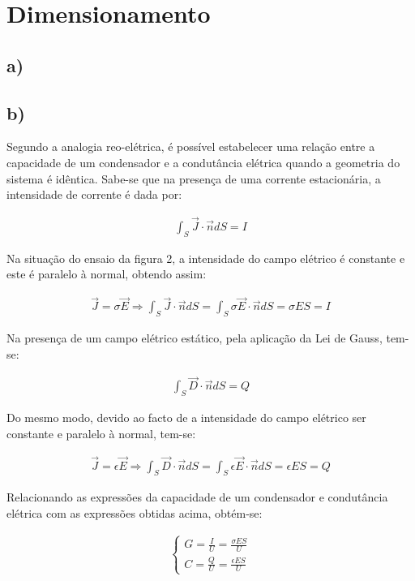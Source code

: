 \documentclass[portuguese, a4paper, titlepage]{article}
\begin{document}
	\section{Dimensionamento}
	\subsection{a)}

	\subsection{b)}
	Segundo a analogia reo-elétrica, é possível estabelecer uma relação entre a capacidade de um condensador e a condutância elétrica quando a geometria do sistema é idêntica.
	Sabe-se que na presença de uma corrente estacionária, a intensidade de corrente é dada por:

	\begin{align*}
		\int _ { S } \vec{J} \cdot \vec{n} d S = I
	\end{align*}

	Na situação do ensaio da figura 2, a intensidade do campo elétrico é constante e este é paralelo à normal, obtendo assim:

	\begin{align*}
		\vec{J} = \sigma \vec{E} \Rightarrow \int _ { S } \vec{J} \cdot \vec{n} d S = \int _ { S } \sigma \vec{E} \cdot \vec{n} d S  = \sigma E S = I
	\end{align*}

	Na presença de um campo elétrico estático, pela aplicação da Lei de Gauss, tem-se:

	\begin{align*}
			\int _ { S } \vec{D} \cdot \vec{n} d S = Q
	\end{align*}

	Do mesmo modo, devido ao facto de a intensidade do campo elétrico ser constante e paralelo à normal, tem-se:

	\begin{align*}
		\vec{J} = \epsilon \vec{E} \Rightarrow \int _ { S } \vec{D} \cdot \vec{n} d S = \int _ { S } \epsilon \vec{E} \cdot \vec{n} d S = \epsilon E S = Q
	\end{align*}

	Relacionando as expressões da capacidade de um condensador e condutância elétrica com as expressões obtidas acima, obtém-se:
	
	\begin{align*}
  		\begin{cases}
			G = \frac{I}{U} = \frac{\sigma E S}{U} \\
    			C =  \frac{Q}{U} = \frac{\epsilon E S}{U}
 		\end{cases}
	\end{align*}
	
\end{document}
